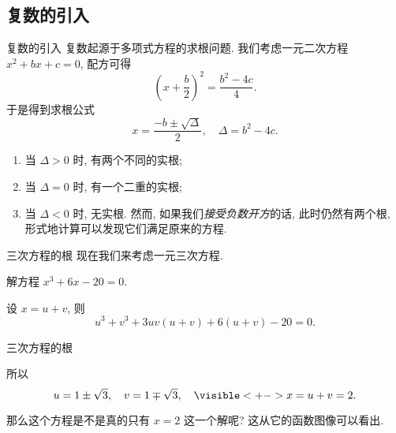 \subsection{复数的引入}

\begin{frame}{复数的引入}
\onslide<+->复数起源于多项式方程的求根问题.
\onslide<+->我们考虑一元二次方程 $x^2+bx+c=0$,
\onslide<+->配方可得
	\[\left(x+\frac b2\right)^2=\frac{b^2-4c}4.\]
\onslide<+->于是得到求根公式
	\[x=\frac{-b\pm\sqrt\Delta}2,\quad \Delta=b^2-4c.\]
	\vspace{-\baselineskip}
\begin{enumerate}
\item 当 $\Delta>0$ 时, 有两个不同的实根;
\item 当 $\Delta=0$ 时, 有一个二重的实根;
\item 当 $\Delta<0$ 时, 无实根.
\onslide<+->然而, 如果我们\emph{接受负数开方}的话, 此时仍然有两个根, 形式地计算可以发现它们满足原来的方程.
\end{enumerate}
\end{frame}

\begin{frame}{三次方程的根}
\onslide<+->现在我们来考虑一元三次方程.
\onslide<+->
\begin{example}
解方程 $x^3+6x-20=0$.
\end{example}
\onslide<+->
\begin{solution}
设 $x=u+v$, 则
	\[u^3+v^3+3uv(u+v)+6(u+v)-20=0.\]
\visible<+->{我们希望
	\[u^3+v^3=20,\quad uv=-2,\]}%
\visible<+->{解得
	\[u^3=10\pm\sqrt{108}\visible<+->{=(1\pm\sqrt3)^3.}\]}
\vspace{-1.2\baselineskip}
\end{solution}
\end{frame}


\begin{frame}{三次方程的根}
\onslide<+->
\begin{solutionc}
\indent 所以 \[u=1\pm\sqrt3,\quad v=1\mp\sqrt 3,\quad
	\visible<+->{x=u+v=2.}\]
\vspace{-\baselineskip}
\end{solutionc}
\onslide<+->
那么这个方程是不是真的只有 $x=2$ 这一个解呢?
\onslide<+->
这从它的函数图像可以看出.
\begin{center}
\end{center}
\end{frame}


